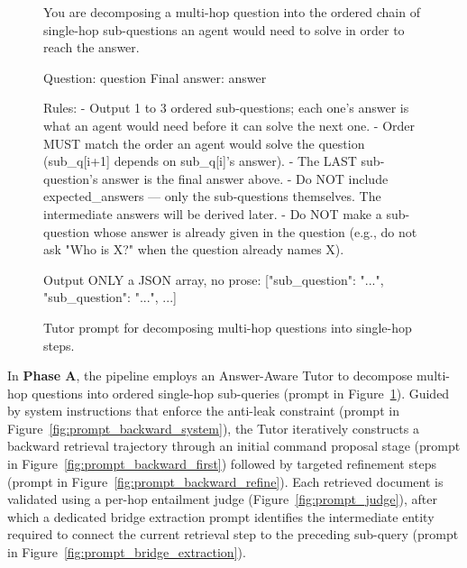 \documentclass{article} %
\begin{document}


\begin{figure}[!b]
\begin{promptbox}[Decomposition]
You are decomposing a multi-hop question into the ordered chain of single-hop sub-questions an agent would need to solve in order to reach the answer.

Question: {question}
Final answer: {answer}

Rules:
- Output 1 to 3 ordered sub-questions; each one's answer is what an agent would need before it can solve the next one.
- Order MUST match the order an agent would solve the question (sub_q[i+1] depends on sub_q[i]'s answer).
- The LAST sub-question's answer is the final answer above.
- Do NOT include expected_answers — only the sub-questions themselves. The intermediate answers will be derived later.
- Do NOT make a sub-question whose answer is already given in the question (e.g., do not ask "Who is X?" when the question already names X).

Output ONLY a JSON array, no prose:
[{{"sub_question": "..."}}, {{"sub_question": "..."}}, ...]
\end{promptbox}
\vspace{-0.4cm}
\caption{Tutor prompt for decomposing multi-hop questions into single-hop steps.}
\label{fig:prompt_decomposition}
\end{figure}

In \textbf{Phase A}, the pipeline employs an Answer-Aware Tutor to decompose multi-hop questions into ordered single-hop sub-queries (prompt in Figure~\ref{fig:prompt_decomposition}). Guided by system instructions that enforce the anti-leak constraint (prompt in Figure~\ref{fig:prompt_backward_system}), the Tutor iteratively constructs a backward retrieval trajectory through an initial command proposal stage (prompt in Figure~\ref{fig:prompt_backward_first}) followed by targeted refinement steps (prompt in Figure~\ref{fig:prompt_backward_refine}). Each retrieved document is validated using a per-hop entailment judge (Figure~\ref{fig:prompt_judge}), after which a dedicated bridge extraction prompt identifies the intermediate entity required to connect the current retrieval step to the preceding sub-query (prompt in Figure~\ref{fig:prompt_bridge_extraction}).
\end{document}
